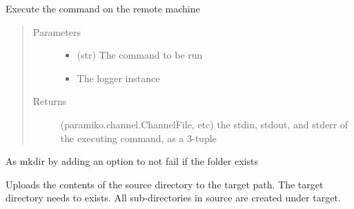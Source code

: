 \documentclass[a4paper,10pt,english]{sphinxmanual}
\begin{document}
\begin{fulllineitems}
\begin{fulllineitems}
\label{\detokenize{apidoc_commands/commands:commands.jobs.Machine.exec_command}}
Execute the command on the remote machine
\begin{quote}\begin{description}
\item[{Parameters}] \leavevmode\begin{itemize}
\item {} 
 \textendash{} (str) The command to be run

\item {} 
 \textendash{} The logger instance

\end{itemize}

\item[{Returns}] \leavevmode
(paramiko.channel.ChannelFile, etc) 
the stdin, stdout, and stderr of the executing command,
as a 3-tuple

\end{description}\end{quote}

\end{fulllineitems}


\begin{fulllineitems}
\label{\detokenize{apidoc_commands/commands:commands.jobs.Machine.mkdir}}
As mkdir by adding an option to not fail if the folder exists

\end{fulllineitems}


\begin{fulllineitems}
\label{\detokenize{apidoc_commands/commands:commands.jobs.Machine.put_dir}}
Uploads the contents of the source directory to the target path.
The target directory needs to exists. 
All sub-directories in source are created under target.

\end{fulllineitems}


\end{fulllineitems}
\end{document}

